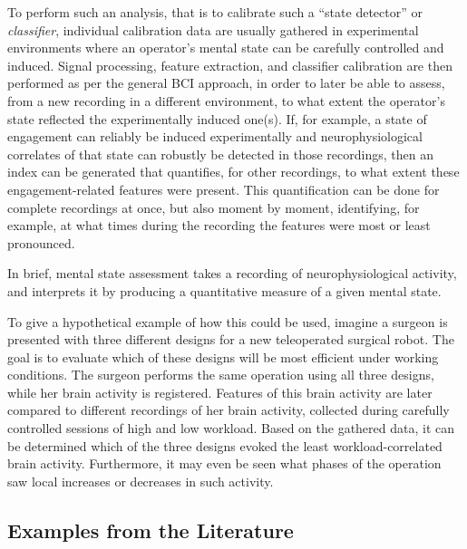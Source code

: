 To perform such an analysis, that is to calibrate such a ``state detector'' or \emph{classifier}, individual calibration data are usually gathered in experimental environments where an operator's mental state can be carefully controlled and induced. Signal processing, feature extraction, and classifier calibration are then performed as per the general BCI approach, in order to later be able to assess, from a new recording in a different environment, to what extent the operator's state reflected the experimentally induced one(s). If, for example, a state of engagement can reliably be induced experimentally and neurophysiological correlates of that state can robustly be detected in those recordings, then an index can be generated that quantifies, for other recordings, to what extent these engagement-related features were present. This quantification can be done for complete recordings at once, but also moment by moment, identifying, for example, at what times during the recording the features were most or least pronounced.

In brief, mental state assessment takes a recording of neurophysiological activity, and interprets it by producing a quantitative measure of a given mental state. 

To give a hypothetical example of how this could be used, imagine a surgeon is presented with three different designs for a new teleoperated surgical robot. The goal is to evaluate which of these designs will be most efficient under working conditions. The surgeon performs the same operation using all three designs, while her brain activity is registered. Features of this brain activity are later compared to different recordings of her brain activity, collected during carefully controlled sessions of high and low workload. Based on the gathered data, it can be determined which of the three designs evoked the least workload-correlated brain activity. Furthermore, it may even be seen what phases of the operation saw local increases or decreases in such activity.


\subsection{Examples from the Literature}
\label{pbci:mentalstateassessment:examples}

